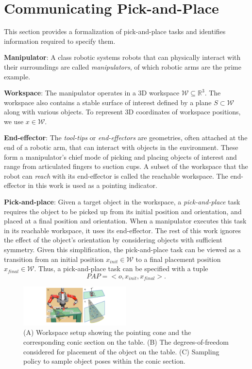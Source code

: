 \section{Communicating Pick-and-Place}
\label{problem}

This section provides a formalization of pick-and-place tasks and identifies  information required to specify them.
 
\noindent\textbf{Manipulator}: A class robotic systems robots that can physically interact with their surroundings are called \textit{manipulators}, of which robotic arms are the prime example. 

\noindent\textbf{Workspace}: The manipulator operates in a 3D workspace $\mathcal{W} \subseteq \mathbb{R}^3$. The workspace also contains a stable surface of interest defined by a plane $S\subset\mathcal{W}$ along with various objects. To represent 3D coordinates of workspace positions, we use $x\in\mathcal{W}$. 

\noindent\textbf{End-effector}: The \textit{tool-tips} or \textit{end-effectors} are geometries, often attached at the end of a robotic arm, that can interact with objects in the environment. These form a manipulator's chief mode of picking and placing objects of interest and range from articulated fingers to suction cups. A subset of the workspace that the robot can \textit{reach} with its end-effector is called the reachable workspace. The end-effector in this work is used as a pointing indicator.

\noindent\textbf{Pick-and-place}: Given a target object in the workspace, a \textit{pick-and-place} task requires the object to be picked up from its initial position and orientation, and placed at a final position and orientation. When a manipulator executes this task in its reachable workspace, it uses its end-effector. 
The rest of this work ignores the effect of the object's orientation by considering objects with sufficient symmetry. Given this simplification, the pick-and-place task can be viewed as a transition from an initial position $x_{init}\in\mathcal{W}$ to a final placement position $x_{final}\in\mathcal{W}$.  Thus, a pick-and-place task can be specified with a tuple
$$ PAP = < o, x_{init}, x_{final} >. $$


\begin{figure}[t]
\centering
\includegraphics[width=0.5\textwidth]{pointing_diagram}
\caption{(A) Workspace setup showing the pointing cone and the corresponding conic section on the table. (B) The degrees-of-freedom considered for placement of the object on the table. (C) Sampling policy to sample object poses within the conic section.}
    \label{fig:pointing}
\end{figure}

